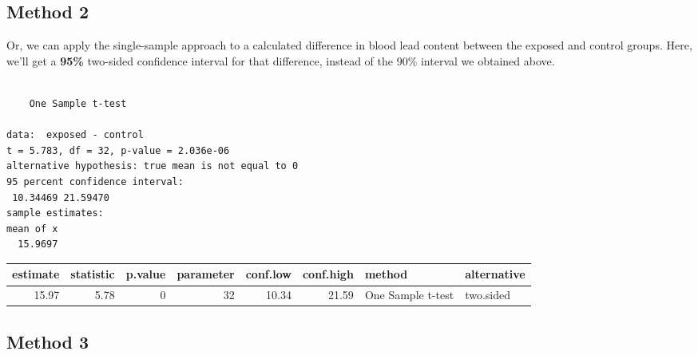 \documentclass[
]{book}
\newenvironment{Shaded}{\begin{snugshade}}{\end{snugshade}}
\newcommand{\DataTypeTok}[1]{\textcolor[rgb]{0.13,0.29,0.53}{#1}}
\newcommand{\DecValTok}[1]{\textcolor[rgb]{0.00,0.00,0.81}{#1}}
\newcommand{\FloatTok}[1]{\textcolor[rgb]{0.00,0.00,0.81}{#1}}
\newcommand{\KeywordTok}[1]{\textcolor[rgb]{0.13,0.29,0.53}{\textbf{#1}}}
\newcommand{\NormalTok}[1]{#1}
\newcommand{\OperatorTok}[1]{\textcolor[rgb]{0.81,0.36,0.00}{\textbf{#1}}}
\newcommand{\StringTok}[1]{\textcolor[rgb]{0.31,0.60,0.02}{#1}}
\begin{document}
\hypertarget{method-2}{%
\subsection{Method 2}\label{method-2}}

Or, we can apply the single-sample approach to a calculated difference in blood lead content between the exposed and control groups. Here, we'll get a \textbf{95\%} two-sided confidence interval for that difference, instead of the 90\% interval we obtained above.

\begin{Shaded}
\end{Shaded}

\begin{verbatim}

	One Sample t-test

data:  exposed - control
t = 5.783, df = 32, p-value = 2.036e-06
alternative hypothesis: true mean is not equal to 0
95 percent confidence interval:
 10.34469 21.59470
sample estimates:
mean of x 
  15.9697 
\end{verbatim}

\begin{Shaded}
\end{Shaded}

\begin{tabular}{r|r|r|r|r|r|l|l}
\hline
estimate & statistic & p.value & parameter & conf.low & conf.high & method & alternative\\
\hline
15.97 & 5.78 & 0 & 32 & 10.34 & 21.59 & One Sample t-test & two.sided\\
\hline
\end{tabular}

\hypertarget{method-3}{%
\subsection{Method 3}\label{method-3}}
\end{document}

